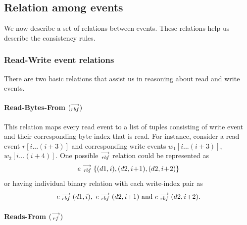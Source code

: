     \subsection{Relation among events}
        We now describe a set of relations between events. These relations help us describe the consistency rules.
        
        \subsubsection{Read-Write event relations}
        There are two basic relations that assist us in reasoning about read and write events.
        
            \paragraph{Read-Bytes-From $(\stackrel{\longrightarrow}{_{rbf}})$}
            
            This relation maps every read event to a list of tuples consisting of write event and their corresponding byte index that is read. For instance, consider a read event $r[i...(i+3)]$ and corresponding write events $w_1[i...(i+3)]$, $w_2[i...(i+4)]$. One possible $\stackrel{\longrightarrow}{_\textit{rbf}}$ relation could be represented as  
                \[e\stackrel{\longrightarrow}{_{\textit{rbf}}}\{(d1, i), (d2, i\!+\!1), (d2, i\!+\!2)\} \]
            or having individual binary relation with each write-index pair as 
            \begin{align*}
                e\stackrel{\longrightarrow}{_{rbf}}(d1, i),\ e\stackrel{\longrightarrow}{_{rbf}}(d2, i\!+\!1)  \text{ and } e\stackrel{\longrightarrow}{_{rbf}}(d2, i\!+\!2).
            \end{align*}
            
            \paragraph{Reads-From $(\stackrel{\longrightarrow}{_{rf}})$}
            
